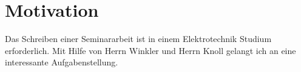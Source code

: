 \chapter{Motivation}
Das Schreiben einer Seminararbeit ist in einem Elektrotechnik Studium erforderlich. Mit Hilfe von Herrn Winkler und Herrn Knoll gelangt ich an eine interessante Aufgabenstellung.  